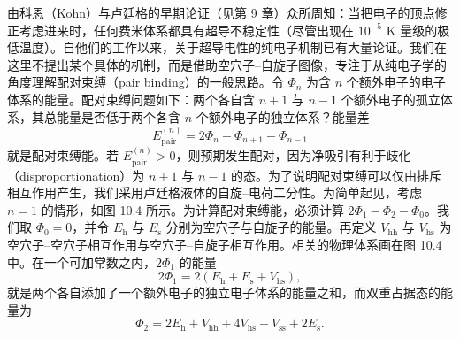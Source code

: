 由科恩（Kohn）与卢廷格的早期论证（见第 9 章）众所周知：当把电子的顶点修正考虑进来时，任何费米体系都具有超导不稳定性（尽管出现在 $10^{-5}$ K 量级的极低温度）。自他们的工作以来，关于超导电性的纯电子机制已有大量论证。我们在这里不提出某个具体的机制，而是借助空穴子–自旋子图像，专注于从纯电子学的角度理解配对束缚（pair binding）的一般思路。令 $\Phi_{n}$ 为含 $n$ 个额外电子的电子体系的能量。配对束缚问题如下：两个各自含 $n+1$ 与 $n-1$ 个额外电子的孤立体系，其总能量是否低于两个各含 $n$ 个额外电子的独立体系？能量差
\begin{equation*}
E_{\mathrm{pair}}^{(n)}=2\Phi_{n}-\Phi_{n+1}-\Phi_{n-1}
\tag{10.65}
\end{equation*}
就是配对束缚能。若 $E_{\mathrm{pair}}^{(n)}>0$，则预期发生配对，因为净吸引有利于歧化（disproportionation）为 $n+1$ 与 $n-1$ 的态。为了说明配对束缚可以仅由排斥相互作用产生，我们采用卢廷格液体的自旋–电荷二分性。为简单起见，考虑 $n=1$ 的情形，如图 10.4 所示。为计算配对束缚能，必须计算 $2\Phi_{1}-\Phi_{2}-\Phi_{0}$。我们取 $\Phi_{0}=0$，并令 $E_{\mathrm{h}}$ 与 $E_{\mathrm{s}}$ 分别为空穴子与自旋子的能量。再定义 $V_{\mathrm{hh}}$ 与 $V_{\mathrm{hs}}$ 为空穴子–空穴子相互作用与空穴子–自旋子相互作用。相关的物理体系画在图 10.4 中。在一个可加常数之内，$2\Phi_{1}$ 的能量
\begin{equation*}
2\Phi_{1}=2\left(E_{\mathrm{h}}+E_{\mathrm{s}}+V_{\mathrm{hs}}\right),
\tag{10.66}
\end{equation*}
就是两个各自添加了一个额外电子的独立电子体系的能量之和，而双重占据态的能量为
\begin{equation*}
\Phi_{2}=2E_{\mathrm{h}}+V_{\mathrm{hh}}+4V_{\mathrm{hs}}+V_{\mathrm{ss}}+2E_{\mathrm{s}}.
\tag{10.67}
\end{equation*}
